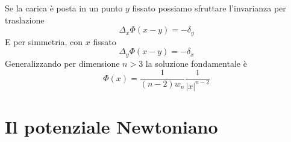 \documentclass[10pt,a4paper,twoside,openright]{book}
\begin{document}
Se la carica è posta in un punto $\displaystyle y$ fissato possiamo sfruttare l'invarianza per traslazione 
\begin{equation*}
	\Delta _{x} \Phi (x-y) =-\delta _{y}
\end{equation*}
E per simmetria, con $\displaystyle x$ fissato
\begin{equation*}
	\Delta _{y} \Phi (x-y) =-\delta _{x}
\end{equation*}
Generalizzando per dimensione $\displaystyle n >3$ la soluzione fondamentale è
\begin{equation*}
	\Phi (x) =\frac{1}{(n-2) w_{n}}\frac{1}{| x| ^{n-2}}
\end{equation*}
\section{Il potenziale Newtoniano}
\end{document}
